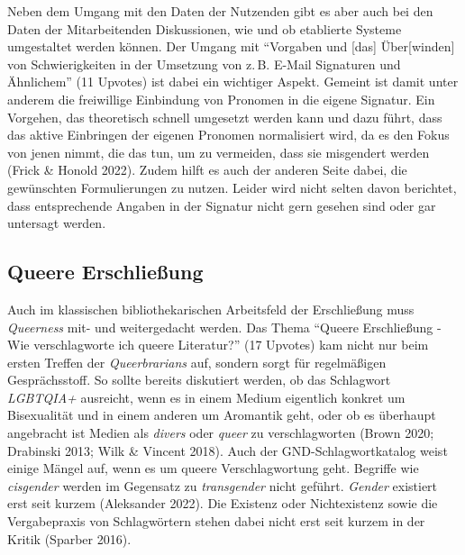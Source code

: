 \documentclass[a4paper,
fontsize=11pt,
oneside,
numbers=noperiodatend,
parskip=half-,
bibliography=totoc,
final
]{scrartcl}
\begin{document}
Neben dem Umgang mit den Daten der Nutzenden gibt es aber auch bei den
Daten der Mitarbeitenden Diskussionen, wie und ob etablierte Systeme
umgestaltet werden können. Der Umgang mit \enquote{Vorgaben und
{[}das{]} Über{[}winden{]} von Schwierigkeiten in der Umsetzung von z.\,B.
E-Mail Signaturen und Ähnlichem} (11 Upvotes) ist dabei ein wichtiger
Aspekt. Gemeint ist damit unter anderem die freiwillige Einbindung von
Pronomen in die eigene Signatur. Ein Vorgehen, das theoretisch schnell
umgesetzt werden kann und dazu führt, dass das aktive Einbringen der
eigenen Pronomen normalisiert wird, da es den Fokus von jenen nimmt, die
das tun, um zu vermeiden, dass sie misgendert werden (Frick \& Honold
2022). Zudem hilft es auch der anderen Seite dabei, die gewünschten
Formulierungen zu nutzen. Leider wird nicht selten davon berichtet, dass
entsprechende Angaben in der Signatur nicht gern gesehen sind oder gar
untersagt werden.

\subsection{Queere Erschließung}\label{queere-erschlieuxdfung}

Auch im klassischen bibliothekarischen Arbeitsfeld der Erschließung muss
\emph{Queerness} mit- und weitergedacht werden. Das Thema
\enquote{Queere Erschließung - Wie verschlagworte ich queere Literatur?}
(17 Upvotes) kam nicht nur beim ersten Treffen der \emph{Queerbrarians}
auf, sondern sorgt für regelmäßigen Gesprächsstoff. So sollte bereits
diskutiert werden, ob das Schlagwort \emph{LGBTQIA+} ausreicht, wenn es
in einem Medium eigentlich konkret um Bisexualität und in einem anderen
um Aromantik geht, oder ob es überhaupt angebracht ist Medien als
\emph{divers} oder \emph{queer} zu verschlagworten (Brown 2020;
Drabinski 2013; Wilk \& Vincent 2018). Auch der GND-Schlagwort\-katalog
weist einige Mängel auf, wenn es um queere Verschlagwortung geht.
Begriffe wie \emph{cisgender} werden im Gegensatz zu \emph{transgender}
nicht geführt. \emph{Gender} existiert erst seit kurzem (Aleksander
2022). Die Existenz oder Nichtexistenz sowie die Vergabepraxis von
Schlagwörtern stehen dabei nicht erst seit kurzem in der Kritik (Sparber
2016).
\end{document}
